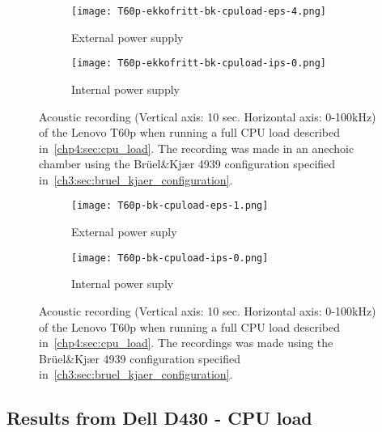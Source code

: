 \begin{figure}[ht]
	\begin{subfigure}{0.8\textwidth}
	    \centering
	    \texttt{[image: T60p-ekkofritt-bk-cpuload-eps-4.png]}
	    \caption{External power supply}
	    \label{fig:T60p-ekkofritt-bk-cpuload-eps-4}
    \end{subfigure}
    \begin{subfigure}{0.8\textwidth}
	    \centering
	    \texttt{[image: T60p-ekkofritt-bk-cpuload-ips-0.png]}
	    \caption{Internal power supply}
	    \label{fig:T60p-ekkofritt-bk-cpuload-ips-0}
    \end{subfigure}
    \caption{Acoustic recording (Vertical axis: 10 sec. Horizontal axis: 0-100kHz) of the Lenovo T60p when running a full CPU load described in~\autoref{chp4:sec:cpu_load}. The recording was made in an anechoic chamber using the Brüel\&Kjær 4939 configuration specified in~\autoref{ch3:sec:bruel_kjaer_configuration}.}
	\label{fig:T60p-ekkofritt-bk-cpuload}
\end{figure}

\begin{figure}[ht]
	\begin{subfigure}{0.8\textwidth}
	    \centering
	    \texttt{[image: T60p-bk-cpuload-eps-1.png]}
	    \caption{External power suply}
	    \label{fig:T60p-bk-cpuload-eps-1-1a}
    \end{subfigure}
    \begin{subfigure}{0.8\textwidth}
	    \centering
	    \texttt{[image: T60p-bk-cpuload-ips-0.png]}
	    \caption{Internal power suply}
	    \label{fig:T60p-bk-cpuload-ips-0-1b}
    \end{subfigure}
    \caption{Acoustic recording (Vertical axis: 10 sec. Horizontal axis: 0-100kHz) of the Lenovo T60p when running a full CPU load described in~\autoref{chp4:sec:cpu_load}. The recordings was made using the Brüel\&Kjær 4939 configuration specified in~\autoref{ch3:sec:bruel_kjaer_configuration}. }
	\label{fig:T60p-bk-cpuload}
\end{figure}


\subsection{Results from Dell D430 - CPU load}\label{chp5:subsec:d430_bk_results_cpuload}

